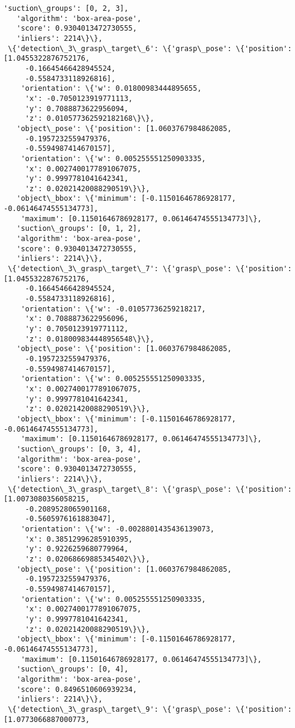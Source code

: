 \documentclass[11pt]{article}
\begin{document}
\begin{tcolorbox}[breakable, size=fbox, boxrule=.5pt, pad at break*=1mm, opacityfill=0]
\begin{Verbatim}[commandchars=\\\{\}]
   'suction\_groups': [0, 2, 3],
   'algorithm': 'box-area-pose',
   'score': 0.9304013472730555,
   'inliers': 2214\}\},
 \{'detection\_3\_grasp\_target\_6': \{'grasp\_pose': \{'position': [1.0455322876752176,
     -0.16645466428945524,
     -0.5584733118926816],
    'orientation': \{'w': 0.01800983444895655,
     'x': -0.7050123919771113,
     'y': 0.7088873622956094,
     'z': 0.010577362592182168\}\},
   'object\_pose': \{'position': [1.0603767984862085,
     -0.1957232559479376,
     -0.5594987414670157],
    'orientation': \{'w': 0.005255551250903335,
     'x': 0.0027400177891067075,
     'y': 0.9997781041642341,
     'z': 0.02021420088290519\}\},
   'object\_bbox': \{'minimum': [-0.11501646786928177, -0.06146474555134773],
    'maximum': [0.11501646786928177, 0.06146474555134773]\},
   'suction\_groups': [0, 1, 2],
   'algorithm': 'box-area-pose',
   'score': 0.9304013472730555,
   'inliers': 2214\}\},
 \{'detection\_3\_grasp\_target\_7': \{'grasp\_pose': \{'position': [1.0455322876752176,
     -0.16645466428945524,
     -0.5584733118926816],
    'orientation': \{'w': -0.01057736259218217,
     'x': 0.7088873622956096,
     'y': 0.7050123919771112,
     'z': 0.018009834448956548\}\},
   'object\_pose': \{'position': [1.0603767984862085,
     -0.1957232559479376,
     -0.5594987414670157],
    'orientation': \{'w': 0.005255551250903335,
     'x': 0.0027400177891067075,
     'y': 0.9997781041642341,
     'z': 0.02021420088290519\}\},
   'object\_bbox': \{'minimum': [-0.11501646786928177, -0.06146474555134773],
    'maximum': [0.11501646786928177, 0.06146474555134773]\},
   'suction\_groups': [0, 3, 4],
   'algorithm': 'box-area-pose',
   'score': 0.9304013472730555,
   'inliers': 2214\}\},
 \{'detection\_3\_grasp\_target\_8': \{'grasp\_pose': \{'position': [1.0073080356058215,
     -0.2089528065901168,
     -0.5605976161883047],
    'orientation': \{'w': -0.0028801435436139073,
     'x': 0.38512996285910395,
     'y': 0.9226259680779964,
     'z': 0.02068669885345402\}\},
   'object\_pose': \{'position': [1.0603767984862085,
     -0.1957232559479376,
     -0.5594987414670157],
    'orientation': \{'w': 0.005255551250903335,
     'x': 0.0027400177891067075,
     'y': 0.9997781041642341,
     'z': 0.02021420088290519\}\},
   'object\_bbox': \{'minimum': [-0.11501646786928177, -0.06146474555134773],
    'maximum': [0.11501646786928177, 0.06146474555134773]\},
   'suction\_groups': [0, 4],
   'algorithm': 'box-area-pose',
   'score': 0.8496510606939234,
   'inliers': 2214\}\},
 \{'detection\_3\_grasp\_target\_9': \{'grasp\_pose': \{'position': [1.0773066887000773,

\end{Verbatim}
\end{tcolorbox}
\end{document}
